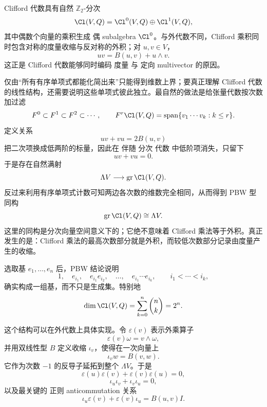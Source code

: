 Clifford 代数具有自然 $\mathbb Z_2$-分次
\[
\Cl(V,Q)
=
\Cl^0(V,Q)
\oplus
\Cl^1(V,Q),
\]
其中偶数个向量的乘积生成 偶 subalgebra $\Cl^0$。与外代数不同，Clifford 乘积同时包含对称的度量收缩与反对称的外积；对 $u,v\in V$，
\[
uv=B(u,v)+u\wedge v.
\]
这正是 Clifford 代数能够同时编码 度量 与 定向 multivector 的原因。

仅由“所有有序单项式都能化简出来”只能得到维数上界；要真正理解 Clifford 代数的线性结构，还需要说明这些单项式彼此独立。最自然的做法是给张量代数按次数加过滤
\[
F^0\subset F^1\subset F^2\subset\cdots,
\qquad
F^r\Cl(V,Q)
=\operatorname{span}\{v_1\cdots v_k:k\le r\}.
\]
定义关系
\[
uv+vu=2B(u,v)
\]
把二次项换成低两阶的标量，因此在 伴随 分次 代数 中低阶项消失，只留下
\[
uv+vu=0.
\]
于是存在自然满射
\[
\Lambda V\longrightarrow
\operatorname{gr}\Cl(V,Q).
\]
反过来利用有序单项式计数可知两边各次数的维数完全相同，从而得到 PBW 型同构
\begin{equation}
\operatorname{gr}\Cl(V,Q)
\cong \Lambda V.
\label{eq:clifford-pbw-graded}
\end{equation}
这里的同构是分次向量空间意义下的；它绝不意味着 Clifford 乘法等于外积。真正发生的是：Clifford 乘法的最高次数部分就是外积，而较低次数部分记录由度量产生的收缩。

选取基 $e_1,\ldots,e_n$ 后，PBW 结论说明
\begin{equation}
1,
\quad e_{i_1},
\quad e_{i_1}e_{i_2},
\quad\ldots,\quad
e_{i_1}\cdots e_{i_k},
\qquad i_1<\cdots<i_k,
\label{eq:clifford-pbw-basis}
\end{equation}
确实构成一组基，而不只是生成集。特别地
\[
\dim\Cl(V,Q)=\sum_{k=0}^n\binom nk=2^n.
\]

这个结构可以在外代数上具体实现。令 $\varepsilon(v)$ 表示外乘算子
\[
\varepsilon(v)\omega=v\wedge\omega,
\]
并用双线性型 $B$ 定义收缩 $\iota_v$，使得在一次向量上
\[
\iota_v w=B(v,w).
\]
它作为次数 $-1$ 的反导子延拓到整个 $\Lambda V$。于是
\[
\varepsilon(u)\varepsilon(v)+\varepsilon(v)\varepsilon(u)=0,
\]
\[
\iota_u\iota_v+\iota_v\iota_u=0,
\]
以及最关键的 正则 anticommutation 关系
\begin{equation}
\iota_u\varepsilon(v)+\varepsilon(v)\iota_u
=B(u,v)I.
\label{eq:clifford-wedge-contraction-car}
\end{equation}

